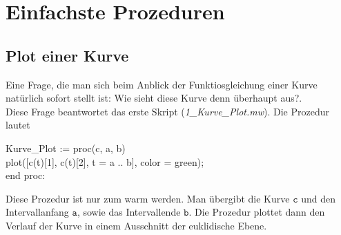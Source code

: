 \documentclass[12pt]{article}
\newenvironment{Code}{\begin{mdframed}[topline=false,bottomline=false,linewidth=1pt]\begin{scriptsize}\begin{tt}}
{\end{tt}\end{scriptsize}\end{mdframed}}
\begin{document}
\section{Einfachste Prozeduren}
\subsection{Plot einer Kurve}
Eine Frage, die man sich beim Anblick der Funktiosgleichung einer Kurve natürlich sofort stellt ist: \glqq Wie sieht diese Kurve denn überhaupt aus?\grqq{}.\\
Diese Frage beantwortet das erste Skript (\textit{1\_Kurve\_Plot.mw}). Die Prozedur lautet
\begin{Code}
Kurve\_Plot := proc(c, a, b)\\
plot([c(t)[1], c(t)[2], t = a .. b], color = green);\\
end proc:
\end{Code}
Diese Prozedur ist nur zum warm werden. Man übergibt die Kurve $\mathtt{c}$ und den Intervallanfang $\mathtt{a}$, sowie das Intervallende $\mathtt{b}$. Die Prozedur plottet dann den Verlauf der Kurve in einem Ausschnitt der euklidische Ebene.\\
\end{document}
